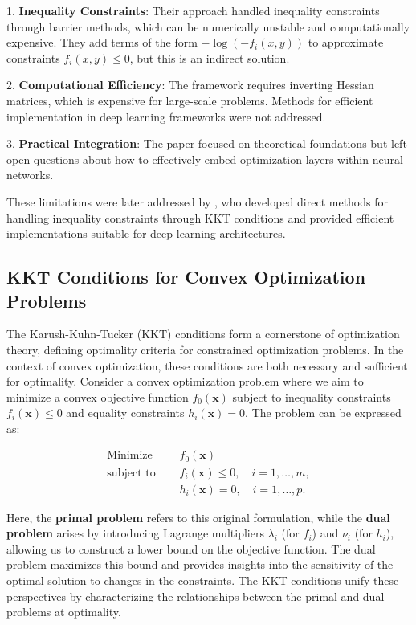 \documentclass{article}
\begin{document}
1. \textbf{Inequality Constraints}: Their approach handled inequality constraints through barrier methods, which can be numerically unstable and computationally expensive. They add terms of the form $-\log(-f_i(x,y))$ to approximate constraints $f_i(x,y) \leq 0$, but this is an indirect solution.

2. \textbf{Computational Efficiency}: The framework requires inverting Hessian matrices, which is expensive for large-scale problems. Methods for efficient implementation in deep learning frameworks were not addressed.

3. \textbf{Practical Integration}: The paper focused on theoretical foundations but left open questions about how to effectively embed optimization layers within neural networks.

These limitations were later addressed by \citep{optnet}, who developed direct methods for handling inequality constraints through KKT conditions and provided efficient implementations suitable for deep learning architectures.

\subsection{KKT Conditions for Convex Optimization Problems}

The Karush-Kuhn-Tucker (KKT) conditions form a cornerstone of optimization theory, defining optimality criteria for constrained optimization problems. In the context of convex optimization, these conditions are both necessary and sufficient for optimality. Consider a convex optimization problem where we aim to minimize a convex objective function $f_0(\mathbf{x})$ subject to inequality constraints $f_i(\mathbf{x}) \leq 0$ and equality constraints $h_i(\mathbf{x}) = 0$. The problem can be expressed as:

\begin{align*}
    \text{Minimize } & \quad f_0(\mathbf{x}) \\
    \text{subject to } & \quad f_i(\mathbf{x}) \leq 0, \quad i = 1, \dots, m, \\
    & \quad h_i(\mathbf{x}) = 0, \quad i = 1, \dots, p.
\end{align*}

Here, the \textbf{primal problem} refers to this original formulation, while the \textbf{dual problem} arises by introducing Lagrange multipliers $\lambda_i$ (for $f_i$) and $\nu_i$ (for $h_i$), allowing us to construct a lower bound on the objective function. The dual problem maximizes this bound and provides insights into the sensitivity of the optimal solution to changes in the constraints. The KKT conditions unify these perspectives by characterizing the relationships between the primal and dual problems at optimality.
\end{document}
